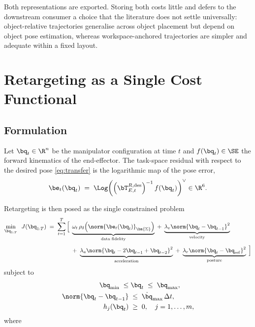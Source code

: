Both representations are exported. Storing both costs little and defers to the
downstream consumer a choice that the literature does not settle universally:
object-relative trajectories generalise across object placement
\cite{orion, spot} but depend on object pose estimation, whereas
workspace-anchored trajectories are simpler and adequate within a fixed layout.

\section{Retargeting as a Single Cost Functional}
\label{sec:retarget}

\subsection{Formulation}

Let $\bq_t \in \R^{n}$ be the manipulator configuration at time $t$ and
$f(\bq_t) \in \SE$ the forward kinematics of the end-effector. The task-space
residual with respect to the desired pose \eqref{eq:transfer} is the
logarithmic map of the pose error,
\begin{equation}
  \be_t(\bq_t) \;=\;
  \Log\!\left(
    \left(\bT^{R,\mathrm{des}}_{E,t}\right)^{-1} f(\bq_t)
  \right)^{\vee} \in \R^{6}.
  \label{eq:residual}
\end{equation}

Retargeting is then posed as the single constrained problem
\begin{equation}
\begin{aligned}
  \min_{\bq_{1:T}} \;\; J(\bq_{1:T}) \;=\; \sum_{t=1}^{T} \Big[\;
   & \underbrace{\omega_t \,\rho_\delta\!\left(
       \norm{\be_t(\bq_t)}_{\bm{\Sigma}}\right)}_{\text{data fidelity}}
   \;+\;
     \underbrace{\lambda_v \norm{\bq_t - \bq_{t-1}}^{2}}_{\text{velocity}}
   \\[1mm]
   &+\;
     \underbrace{\lambda_a \norm{\bq_t - 2\bq_{t-1} + \bq_{t-2}}^{2}}
       _{\text{acceleration}}
   \;+\;
     \underbrace{\lambda_r \norm{\bq_t - \bq_{\mathrm{ref}}}^{2}}
       _{\text{posture}}
  \;\Big]
\end{aligned}
\label{eq:cost}
\end{equation}
subject to
\begin{align}
  \bq_{\min} \;\le\; &\bq_t \;\le\; \bq_{\max}, \label{eq:cjoint}\\
  \norm{\bq_t - \bq_{t-1}} \;&\le\; \dot{\bq}_{\max}\,\Delta t,
    \label{eq:cvel}\\
  h_j(\bq_t) \;&\ge\; 0, \quad j = 1,\dots,m, \label{eq:ccoll}
\end{align}
where

